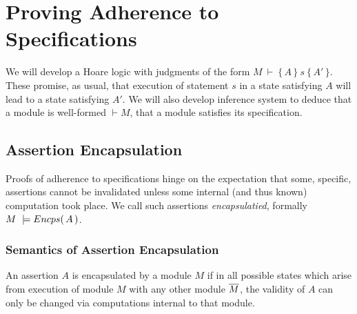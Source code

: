 \newcommand{\extract}[1]{\ensuremath{{\mathcal I}\!nvs(#1)}}
\newcommand{\specs}[1]{\ensuremath{Specs(#1)}}%


\section{Proving Adherence to \SpecLang Specifications}
\label{sect:proofSystem}

We will develop a  Hoare logic with judgments of the form  $M\ \vdash\  \{\, A \,  \}\ s\  \{\, A' \, \}$. These promise, as usual, that execution of statement $s$ in a state satisfying $A$ will lead to a state satisfying $A'$. We will also develop inference system to deduce that a module is well-formed $\vdash M$, \ie that a module satisfies its specification.

\subsection {Assertion Encapsulation}
\label{s:encaps-proof}

{
Proofs of adherence to {\SpecLang specifications  hinge on the expectation that some, 
specific, assertions cannot be invalidated unless some 
} internal (and thus known) computation took place. 
{We call such assertions   \emph{encapsulatied},}
}
formally $M\ \models  {\ensuremath Encps(\, A\, )}$.
 

\subsubsection{Semantics of Assertion Encapsulation}

{An assertion $A$  is  encapsulated by a module $M$  if in all possible states which arise from execution of module $M$ with any other  module $\overline{M}$, the validity of $A$}  {can only be changed via computations internal to that module}.
 

